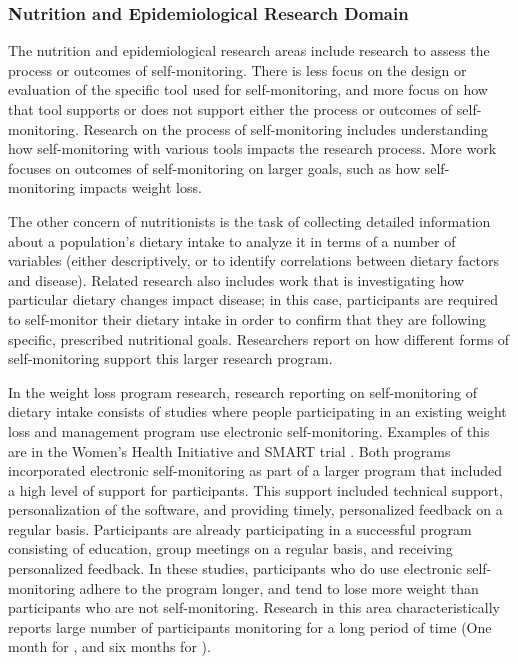 \subsubsection{Nutrition and Epidemiological Research Domain}

The nutrition and epidemiological research areas include research to assess the process or outcomes of self-monitoring. There is less focus on the design or evaluation of the specific tool used for self-monitoring, and more focus on how that tool supports or does not support either the process or outcomes of self-monitoring. Research on the process of self-monitoring includes understanding how self-monitoring with various tools impacts the research process. More work focuses on outcomes of self-monitoring on larger goals, such as how self-monitoring impacts weight loss. 

The other concern of nutritionists is the task of collecting detailed information about a population's dietary intake to analyze it in terms of a number of variables (either descriptively, or to identify correlations between dietary factors and disease). Related research also includes work that is investigating how particular dietary changes impact disease; in this case, participants are required to self-monitor their dietary intake in order to confirm that they are following specific, prescribed nutritional goals. Researchers report on how different forms of self-monitoring support this larger research program. 

In the weight loss program research, research reporting on self-monitoring of dietary intake consists of studies where people participating in an existing weight loss and management program use electronic self-monitoring.  Examples of this are in the Women's Health Initiative \citep{glanz_improving_2006} and SMART trial \citep{burke_self-monitoring_2011}. Both programs incorporated electronic self-monitoring as part of a larger program that included a high level of support for participants. This support included technical support,  personalization of the software, and providing timely, personalized feedback on a regular basis.  Participants are already participating in a successful program consisting of education, group meetings on a regular basis, and receiving personalized feedback. In these studies, participants who do use electronic self-monitoring adhere to the program longer, and tend to lose more weight than participants who are not self-monitoring. Research in this area characteristically reports large number of participants monitoring for a long period of time (One month for \cite{glanz_improving_2006}, and six months for \cite{burke_self-monitoring_2011}). 

